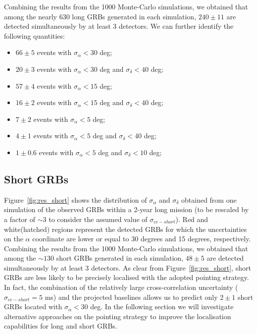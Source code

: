 \documentclass[]{spie}  %
\begin{document}
Combining the results from the 1000 Monte-Carlo simulations, we obtained that among the nearly 630 long GRBs generated in each simulation, $240\pm11$ are detected simultaneously by at least 3 detectors. We can further identify the following quantities:
\begin{itemize}
\item $66\pm5$ events with $\sigma_\alpha < 30$ deg;
\item	$20\pm3$ events with $\sigma_\alpha < 30$ deg and $\sigma_\delta < 40$ deg;
\item	$57\pm4$ events with $\sigma_\alpha < 15$ deg;
\item	$16\pm2$ events with $\sigma_\alpha < 15$ deg and $\sigma_\delta < 40$ deg;
\item	$7\pm2$ events with $\sigma_\alpha < 5$ deg;
\item	$4\pm1$ events with $\sigma_\alpha < 5$ deg and $\sigma_\delta < 40$ deg;
\item	$1\pm0.6$ events with $\sigma_\alpha < 5$ deg and $\sigma_\delta < 10$ deg;
\end{itemize}


\subsection{Short GRBs}

Figure~\ref{fig:res_short} shows the distribution of $\sigma_\alpha$ and $\sigma_\delta$ obtained from one simulation of the observed GRBs within a 2-year long mission (to be rescaled by a factor of $\sim3$ to consider the assumed value of $\sigma_{cc-short}$). Red and white(hatched) regions represent the detected GRBs for which the uncertainties on the $\alpha$ coordinate are lower or equal to 30 degrees and 15 degrees, respectively. Combining the results from the 1000 Monte-Carlo simulations, we obtained that among the $\sim130$ short GRBs generated in each simulation, $48\pm5$ are detected simultaneously by at least 3 detectors. As clear from Figure~\ref{fig:res_short}, short GRBs are less likely to be precisely localised with the adopted pointing strategy. In fact, the combination of the relatively large cross-correlation uncertainty ($\sigma_{cc-short} = 5$ ms) and the projected baselines allows us to predict only $2\pm1$ short GRBs located with $\sigma_\alpha < 30$ deg. In the following section we will investigate alternative approaches on the pointing strategy to improve the localisation capabilities for long and short GRBs.
\end{document}
